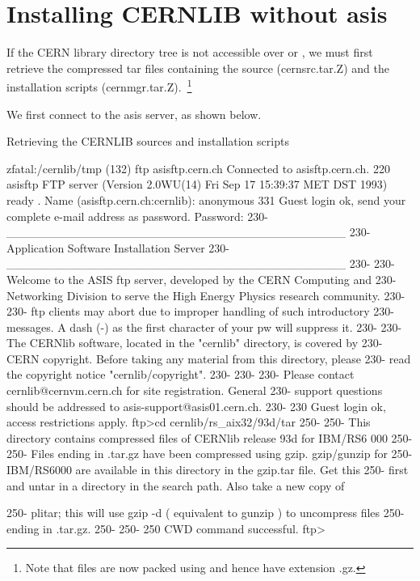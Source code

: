 \section{Installing CERNLIB without asis}

If the CERN library directory tree is not accessible over \NFS{}
or  \AFS{}, we must first retrieve the compressed tar files containing
the source (cernsrc.tar.Z) and the installation scripts (cernmgr.tar.Z).~\footnote{Note that files are now packed using \GZIP{} and hence have extension .gz.}

We first connect to the asis server, as shown below.

\begin{XMPt}{Retrieving the CERNLIB sources and installation scripts}

zfatal:/cernlib/tmp (132) ftp asisftp.cern.ch
Connected to asisftp.cern.ch.
220 asisftp FTP server (Version 2.0WU(14) Fri Sep 17 15:39:37 MET DST 1993) ready
.
Name (asisftp.cern.ch:cernlib): anonymous
331 Guest login ok, send your complete e-mail address as password.
Password:
230-                   ________________________________________
230-                   Application Software Installation Server
230-                   ________________________________________
230-
230-   Welcome to the ASIS ftp server, developed by the CERN Computing and
230-   Networking Division to serve the High Energy Physics research community.
230-
230-   ftp clients may abort due to improper handling of such introductory
230-   messages. A dash (-) as the first character of your pw will suppress it.
230-
230-   The CERNlib software, located in the "cernlib" directory, is covered by
230-   CERN copyright. Before taking any material from this directory, please
230-   read the copyright notice "cernlib/copyright".
230-
230-
230-   Please contact cernlib@cernvm.cern.ch for site registration. General
230-   support questions should be addressed to asis-support@asis01.cern.ch. 
230-
230 Guest login ok, access restrictions apply.
ftp>cd cernlib/rs_aix32/93d/tar
250-
250- This directory contains compressed files of CERNlib release 93d for IBM/RS6
000
250-
250- Files ending in .tar.gz have been compressed using gzip. gzip/gunzip for
250- IBM/RS6000 are available in this directory in the gzip.tar file. Get this
250- first and untar in a directory in the search path. Also take a new copy of 

250- plitar; this will use gzip -d ( equivalent to gunzip ) to uncompress files
250- ending in .tar.gz.
250- 
250-
250 CWD command successful.
ftp> 


\end{XMPt}
